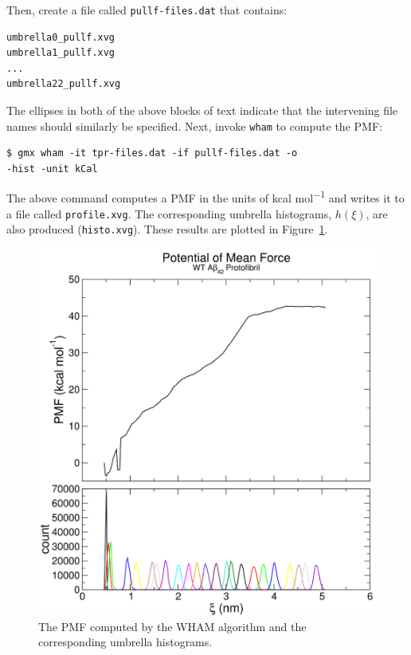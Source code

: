 \documentclass[9pt,tutorial]{livecoms}
\begin{document}
Then, create a file called \texttt{pullf-files.dat} that contains:

\begin{verbatim}
umbrella0_pullf.xvg
umbrella1_pullf.xvg
...
umbrella22_pullf.xvg
\end{verbatim}

The ellipses in both of the above blocks of text indicate that the intervening file names should similarly be specified. Next, invoke \texttt{wham} to compute the PMF:

\begin{verbatim}
$ gmx wham -it tpr-files.dat -if pullf-files.dat -o 
-hist -unit kCal
\end{verbatim}

The above command computes a PMF in the units of kcal mol\textsuperscript{$-$1} and writes it to a file called \texttt{profile.xvg}. The corresponding umbrella histograms, $h(\xi)$, are also produced (\texttt{histo.xvg}). These results are plotted in Figure~\ref{umbrella_composite_pmf_histo_fig}.

\begin{figure}[h!]
\centering
\includegraphics{umbrella_composite_pmf_histo}
\caption{The PMF computed by the WHAM algorithm and the corresponding umbrella histograms.}
\label{umbrella_composite_pmf_histo_fig}
\end{figure}
\end{document}
